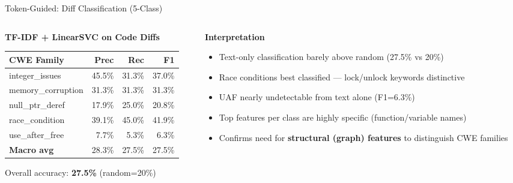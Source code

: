 \documentclass[aspectratio=169,10pt]{beamer}
\newcommand{\chit}[1]{\cellcolor{hit!30} #1}
\newcommand{\cmiss}[1]{\cellcolor{miss!25} #1}
\begin{document}
\begin{frame}{Token-Guided: Diff Classification (5-Class)}

  \centering
  \vspace{0.2em}
  \begin{columns}[T]
  \begin{column}{0.48\textwidth}
    {\small\textbf{TF-IDF + LinearSVC on Code Diffs}}\\[6pt]
    {\scriptsize
    \renewcommand{\arraystretch}{1.3}
    \begin{tabular}{lrrr}
      \toprule
      \textbf{CWE Family} & \textbf{Prec} & \textbf{Rec} & \textbf{F1} \\
      \midrule
      integer\_issues & 45.5\% & 31.3\% & 37.0\% \\
      memory\_corruption & 31.3\% & 31.3\% & 31.3\% \\
      null\_ptr\_deref & 17.9\% & 25.0\% & 20.8\% \\
      \rowcolor{c1!10}
      race\_condition & \chit{39.1\%} & \chit{45.0\%} & \chit{41.9\%} \\
      use\_after\_free & \cmiss{7.7\%} & \cmiss{5.3\%} & \cmiss{6.3\%} \\
      \midrule
      \textbf{Macro avg} & 28.3\% & 27.5\% & 27.5\% \\
      \bottomrule
    \end{tabular}}

    \vspace{0.3em}
    {\scriptsize Overall accuracy: \textbf{27.5\%} (random=20\%)}
  \end{column}
  \begin{column}{0.48\textwidth}
    {\small\textbf{Interpretation}}\\[6pt]
    {\scriptsize
    \begin{itemize}\itemsep3pt
      \item Text-only classification barely above random (27.5\% vs 20\%)
      \item Race conditions best classified — lock/unlock keywords distinctive
      \item UAF nearly undetectable from text alone (F1=6.3\%)
      \item Top features per class are highly specific (function/variable names)
      \item Confirms need for \textbf{structural (graph) features} to distinguish CWE families
    \end{itemize}}
  \end{column}
  \end{columns}
\end{frame}
\end{document}
